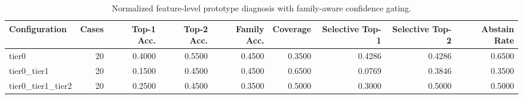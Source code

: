 \begin{table}[t]
\centering
\caption{Normalized feature-level prototype diagnosis with family-aware confidence gating.}
\label{tab:dice_stressor_hierarchical_diagnosis}
\footnotesize
\begin{tabular}{lrrrrrrrr}
\toprule
Configuration & Cases & Top-1 Acc. & Top-2 Acc. & Family Acc. & Coverage & Selective Top-1 & Selective Top-2 & Abstain Rate \\
\midrule
tier0 & 20 & 0.4000 & 0.5500 & 0.4500 & 0.3500 & 0.4286 & 0.4286 & 0.6500 \\
tier0_tier1 & 20 & 0.1500 & 0.4500 & 0.4500 & 0.6500 & 0.0769 & 0.3846 & 0.3500 \\
tier0_tier1_tier2 & 20 & 0.2500 & 0.4500 & 0.3500 & 0.5000 & 0.3000 & 0.5000 & 0.5000 \\
\bottomrule
\end{tabular}

\end{table}
